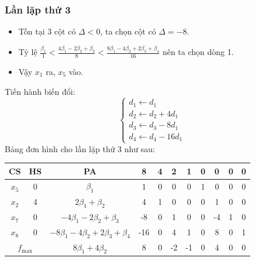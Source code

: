 \documentclass[12pt]{article}
\begin{document}
\subsubsection{Lần lặp thứ 3}
\begin{itemize}
\item Tồn tại 3 cột có $\Delta < 0$, ta chọn cột có $\Delta = -8$.
\item Tỷ lệ $\displaystyle \frac{\beta_1}{1} < \frac{4\beta_1 - 2\beta_2 + \beta_3}{8} < \frac{8\beta_1 - 4\beta_2 + 2\beta_3 + \beta_4}{16}$ nên ta chọn dòng 1.
\item Vậy $x_1$ ra, $x_5$ vào.
\end{itemize}
Tiến hành biến đổi:
$$
\left\{
\begin{array}{lll}
d_1 \leftarrow d_1 \\
d_2 \leftarrow d_2 + 4d_1 \\
d_3 \leftarrow d_3 - 8d_1 \\
d_4 \leftarrow d_4 - 16d_1
\end{array}
\right.
$$
Bảng đơn hình cho lần lặp thứ 3 như sau:
\begin{table}[H]
\centering
\begin{tabular}{|c|c|c|c|c|c|c|c|c|c|c|}
\hline
CS & HS & PA & 8 & 4 & 2 & 1 & 0 & 0 & 0 & 0 \\
\hline
$x_5$ & 0 & $\beta_1$ & 1 & 0 & 0 & 0 & 1 & 0 & 0 & 0 \\
$x_2$ & 4 & $2\beta_1 + \beta_2$ & 4 & 1 & 0 & 0 & 0 & 1 & 0 & 0 \\
$x_7$ & 0 & $-4\beta_1 - 2\beta_2 + \beta_3$ & -8 & 0 & 1 & 0 & 0 & -4 & 1 & 0 \\
$x_8$ & 0 & $-8\beta_1 - 4\beta_2 + 2\beta_3 + \beta_4$ & -16 & 0 & 4 & 1 & 0 & 8 & 0 & 1 \\
\hline
\multicolumn{2}{|c|}{$f_{\max}$}
& $8\beta_1 + 4\beta_2$ & 8 & 0 & -2 & -1 & 0 & 4 & 0 & 0 \\
\hline
\end{tabular}
\end{table}
\end{document}
